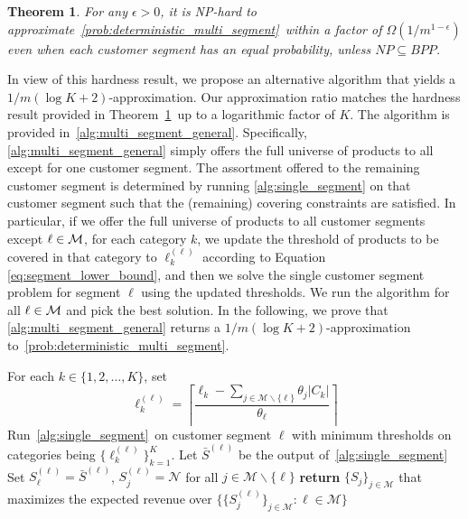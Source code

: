 \documentclass[msom,non-blindrev]{informs3} %
\newtheorem{theorem}{Theorem}
\theoremstyle{definition}
\begin{document}
\begin{theorem}\label{thm:hardness_multi_segment}
For any $\epsilon>0$, it is NP-hard to approximate~\eqref{prob:deterministic_multi_segment}~within a factor of $\Omega(1/m^{1-\epsilon})$ even when each customer segment has an equal probability, unless $NP\subseteq BPP$.
\end{theorem}


In view of this hardness result, we propose an alternative algorithm that yields a $1/m(\log K + 2)$-approximation. 
Our approximation ratio matches the hardness result provided in Theorem~\ref{thm:hardness_multi_segment}~up to a logarithmic factor of $K$. The algorithm is provided in~\cref{alg:multi_segment_general}. Specifically, \cref{alg:multi_segment_general} simply offers the full universe of products to all except for one customer segment. The assortment offered to the remaining customer segment is determined by running \cref{alg:single_segment} on that customer segment such that the (remaining) covering constraints are satisfied. In particular, if we offer the full universe of products to all customer segments except $\ell \in {\cal M}$, for each category $k$, we update the threshold of products to be covered in that category to $\ell_k^{(\ell)}$ according to Equation \eqref{eq:segment_lower_bound}, and then we solve the single customer segment problem for segment $\ell$ using the updated thresholds. We run the algorithm for all $\ell \in {\cal M}$ and pick the best solution.
In the following, we prove that \cref{alg:multi_segment_general} returns a $1/m(\log K+2)$-approximation to~\eqref{prob:deterministic_multi_segment}.

\begin{algorithm}[!ht]
\caption{Multi-segment assortment optimization with general number of segments}
\SingleSpacedXI
\label{alg:multi_segment_general}
\begin{algorithmic}
\State For each $k\in\{1,2,\dots,K\}$, set
\begin{equation}
\ell_k^{(\ell)}=\left\lceil \dfrac{\ell_k-\sum_{j\in\mathcal{M}\backslash\{\ell\}}\theta_{j}|C_k|}{\theta_\ell}\right\rceil\label{eq:segment_lower_bound}
\end{equation}
\State Run~\cref{alg:single_segment}~on customer segment $\ell$ with minimum thresholds on categories being $\{\ell_k^{(\ell)}\}_{k=1}^K$. Let $\bar{S}^{(\ell)}$ be the output of~\cref{alg:single_segment}
\State Set $S_\ell^{(\ell)}=\bar{S}^{(\ell)}$, $S_j^{(\ell)}=\mathcal{N}$ for all $j\in\mathcal{M}\backslash\{\ell\}$
\EndFor
\State \textbf{return} $\{S_j\}_{j\in\mathcal{M}}$ that maximizes the expected revenue over $\{\{S_j^{(\ell)}\}_{j\in\mathcal{M}}:\ell\in\mathcal{M}\}$
\end{algorithmic}
\end{algorithm}
\end{document}
